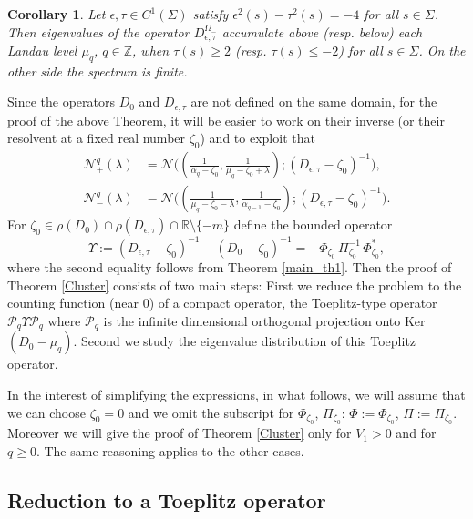 \documentclass[11pt,a4paper,reqno,oneside]{amsproc}
\def \rr {{\mathbb R}}
\def \zz {{\mathbb Z}}
\numberwithin{equation}{section}
\newtheorem{corollary}[definition]{Corollary}
\begin{document}
\begin{corollary}\label{ClusConf} Let $\epsilon,\tau\in C^1(\Sigma)$ satisfy $\epsilon^2(s)-\tau^2(s)= -4$ for all $s\in\Sigma$. Then eigenvalues of the operator $D_{\epsilon,\tau}^{\Omega_-}$ accumulate above (resp. below) each Landau level $\mu_q$, $q \in \zz$,  when $\tau (s) \geq 2$ (resp. $\tau  (s) \leq - 2$)  for all $s\in\Sigma$. On the other side the spectrum is finite. 
\end{corollary}






Since the operators $D_0$ and $D_{\epsilon,\tau}$ are not defined on the same domain, for the proof of the above Theorem, it will be easier to work on their inverse (or their resolvent at a fixed real number $\zeta_0$) and to exploit that
 \begin{align*}
 {\mathcal N}_{+}^q(\lambda)&=\mathcal N\Big((\frac{1}{\alpha_q- \zeta_0},\frac{1}{\mu_q- \zeta_0+\lambda});{(D_{\epsilon,\tau}- \zeta_0)^{-1}}\Big)
 , \\
 {\mathcal N}_{-}^q(\lambda)&=\mathcal N\Big((\frac{1}{\mu_q- \zeta_0-\lambda}, \frac{1}{\alpha_{q-1} -\zeta_0}); (D_{\epsilon,\tau}- \zeta_0)^{-1}\Big).
 \end{align*}
For $\zeta_0 \in \rho(D_0) \cap \rho(D_{\epsilon,\tau})\cap \rr\setminus\{-m\}$ define the bounded operator
\[
\Upsilon:=(D_{\epsilon,\tau} - \zeta_0)^{-1}-(D_0 - \zeta_0)^{-1} = -\Phi_{\zeta_0}\,\Pi_{\zeta_0}^{-1}\,\Phi_{\zeta_0}^{*},
\]
where the second equality follows from Theorem \ref{main_th1}. Then the proof of Theorem \ref{Cluster} consists of two main steps: First we reduce the problem to the counting function (near $0$) of a compact operator, the Toeplitz-type operator $ \mathcal P_q \Upsilon \mathcal P_q$ where ${\mathcal P}_{q}$ is  the  infinite dimensional orthogonal projection onto Ker$(D_0-\mu_{q})$. Second we study the eigenvalue distribution of this Toeplitz operator.

In the interest of simplifying the expressions, in what follows, we will assume that we can choose $\zeta_0=0$ and we omit the subscript for $\Phi_{\zeta_0}$, $\Pi_{\zeta_0}$: $\Phi:=\Phi_{\zeta_0}$, $\Pi:=\Pi_{\zeta_0}$.
Moreover we will give the proof of Theorem \ref{Cluster} only for $V_1>0$ and for $q\geq 0$. The same reasoning applies to the other cases.

\subsection{Reduction to a Toeplitz operator }\label{SEC51}
\end{document}
